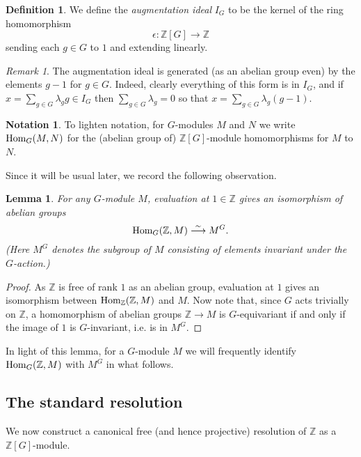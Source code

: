 \documentclass[11pt]{amsart}
\numberwithin{equation}{section}
\newtheorem{lemma}[equation]{Lemma}
\theoremstyle{remark}
\newtheorem{remark}[equation]{Remark}
\theoremstyle{remark}
\theoremstyle{remark}
\theoremstyle{definition}
\theoremstyle{definition}
\theoremstyle{definition}
\newtheorem{defi}[equation]{Definition}
\theoremstyle{definition}
\newtheorem{notation}[equation]{Notation}
\theoremstyle{definition}
\theoremstyle{definition}
\begin{document}
\begin{defi}
We define the \textit{augmentation ideal} $I_G$ to be the kernel of the ring homomorphism 
\[\epsilon:\mathbb{Z}[G]\rightarrow \mathbb{Z}\]
sending each $g\in G$ to $1$ and extending linearly. 
\end{defi}

\begin{remark} \label{augmentationideagens}
The augmentation ideal is generated (as an abelian group even) by the elements $g-1$ for $g\in G$. Indeed, clearly everything of this form is in $I_G$, and if $x=\sum_{g\in G}\lambda_gg\in I_G$ then $\sum_{g\in G}\lambda_g=0$  so that
$x=\sum_{g\in G}\lambda_g(g-1)$.
\end{remark}

\begin{notation}
To lighten notation, for $G$-modules $M$ and $N$ we write $\textup{Hom}_G(M,N)$ for the (abelian group of) $\mathbb{Z}[G]$-module homomorphisms for $M$ to $N$. 
\end{notation}

Since it will be usual later, we record the following observation.

\begin{lemma} \label{invariants as hom}
For any $G$-module $M$, evaluation at $1\in \mathbb{Z}$ gives an isomorphism of abelian groups
\[\textup{Hom}_{G}(\mathbb{Z},M)\stackrel{\sim}{\longrightarrow}M^G.\]
(Here $M^G$ denotes the subgroup of $M$ consisting of elements invariant under the $G$-action.)
\end{lemma}

\begin{proof}
As $\mathbb{Z}$ is free of rank $1$ as an abelian group, evaluation at $1$ gives an isomorphism between $\textup{Hom}_{\mathbb{Z}}(\mathbb{Z},M)$ and $M$. Now note that, since $G$ acts trivially on $\mathbb{Z}$, a homomorphism of abelian groups $\mathbb{Z}\rightarrow M$ is $G$-equivariant if and only if the image of $1$ is $G$-invariant, i.e. is in $M^G$. 
\end{proof}

In light of this lemma, for a $G$-module $M$ we will frequently identify  $\textup{Hom}_{G}(\mathbb{Z},M)$ with $M^G$ in what follows.

\subsection{The standard resolution}
We now construct a canonical free (and hence projective) resolution of $\mathbb{Z}$ as a $\mathbb{Z}[G]$-module.
\end{document}
